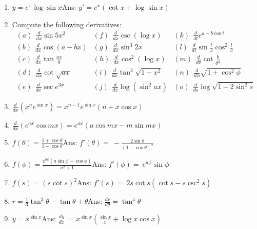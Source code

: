 \begin{enumerate}
\item
$y = e^x\log\sin x$\qquad\qquad\qquad\qquad\qquad\qquad Ans:  $y'= e^x(\cot x + \log\sin x)$

\item
Compute the following derivatives: %
\[
\begin{array}{lll}
(a) \ \  \frac{d}{dx} \sin 5x^2 &  	(f) \ \  \frac{d}{dx} \csc(\log x) &  	(k) \ \  \frac{d}{dt} e^{a - b\cos t}\\
(b) \ \  \frac{d}{dx} \cos(a - bx) &  	(g) \ \  \frac{d}{dx} \sin^3 2x & (l) \ \  \frac{d}{dt} \sin \frac{t}{3} \cos^2 \frac{t}{3}\\
(c) \ \  \frac{d}{dx} \tan \frac{ax}{b} &  	(h) \ \  \frac{d}{dx} \cos^2(\log x) &  	(m) \ \  \frac{d}{d\theta} \cot \frac{b}{\theta^2}\\
(d) \ \  \frac{d}{dx} \cot \sqrt{ax} &  	(i) \ \  \frac{d}{dx} \tan^2 \sqrt{1 - x^2} &  	(n) \ \  \frac{d}{d\phi} \sqrt{1 + \cos^2 \phi}\\
(e) \ \  \frac{d}{dx} \sec e^{3x} &  	(j) \ \  \frac{d}{dx} \log(\sin^2 ax) &  	(o) \ \  \frac{d}{ds} \log \sqrt{1 - 2\sin^2 s}
\end{array}
\]

\item
$\frac{d}{dx}(x^n e^{\sin x}) = x^{n - 1} e^{\sin x} (n + x\cos x)$

\item
$\frac{d}{dx} (e^{ax} \cos mx) = e^{ax}(a \cos mx - m \sin mx)$

\item
$f(\theta) = \frac{1 + \cos \theta}{1 - \cos \theta}$\qquad\qquad\qquad\qquad\qquad\qquad Ans:  	
$ f'(\theta) 	=\ -\frac{2 \sin \theta}{(1 - \cos \theta)^2}$

\item
$f(\phi) = \frac{e^{a\phi}(a \sin \phi - \cos \phi)}{a^2 + 1}$\qquad\qquad\qquad\qquad\qquad\qquad Ans:  	
$ f'(\phi) 	=\ e^{a\phi} \sin \phi$

\item
$f(s) = (s \cot s)^2$\qquad\qquad\qquad\qquad Ans:  	 
$f'(s) =\ 2s \cot s (\cot s - s \csc^2 s)$

\item
$r = \frac{1}{3} \tan^3 \theta - \tan \theta + \theta$\qquad\qquad\qquad\qquad\qquad\qquad Ans:  
$\frac{dr}{d\theta} 	= \tan^4\theta$

\item
$y = x^{\sin x}$\qquad\qquad\qquad\qquad\qquad\qquad Ans:  
$\frac{dy}{dx} 	=\ x^{\sin x} \left ( \frac{\sin x}{x} + \log x \cos x \right )$


\end{enumerate}
